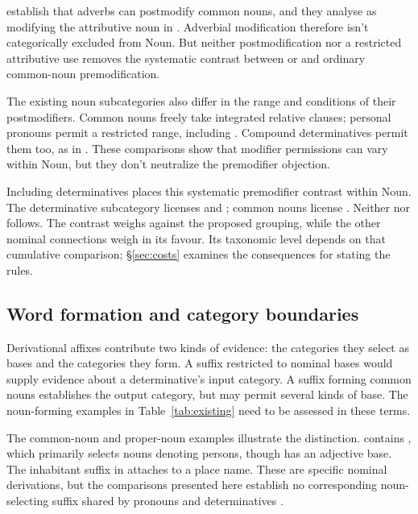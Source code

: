 \documentclass[12pt]{article}
\begin{document}
\textcite[42--47]{payne2010} establish that adverbs can postmodify common nouns, and they analyse  as modifying the attributive noun  in  \citep[p.~75, n.~3]{payne2010}. Adverbial modification therefore isn't categorically excluded from Noun. But neither postmodification nor a restricted attributive use removes the systematic contrast between  or  and ordinary common-noun premodification.

The existing noun subcategories also differ in the range and conditions of their postmodifiers. Common nouns freely take integrated relative clauses; personal pronouns permit a restricted range, including  \citep[430]{huddleston2002}. Compound determinatives permit them too, as in  \citep[423--424]{huddleston2002}. These comparisons show that modifier permissions can vary within Noun, but they don't neutralize the premodifier objection.

Including determinatives places this systematic premodifier contrast within Noun. The determinative subcategory licenses  and ; common nouns license . Neither  nor  follows. The contrast weighs against the proposed grouping, while the other nominal connections weigh in its favour. Its taxonomic level depends on that cumulative comparison; §\ref{sec:costs} examines the consequences for stating the rules.

\subsection{Word formation and category boundaries}\label{sec:word-formation}

Derivational affixes contribute two kinds of evidence: the categories they select as bases and the categories they form. A suffix restricted to nominal bases would supply evidence about a determinative's input category. A suffix forming common nouns establishes the output category, but may permit several kinds of base. The noun-forming examples in Table~\ref{tab:existing} need to be assessed in these terms.

The common-noun and proper-noun examples illustrate the distinction.  contains , which primarily selects nouns denoting persons, though  has an adjective base. The inhabitant suffix  in  attaches to a place name. These are specific nominal derivations, but the comparisons presented here establish no corresponding noun-selecting suffix shared by pronouns and determinatives \citep[Ch.~19, §§5.6.2(b), 5.7.2(k)]{huddleston2002}.
\end{document}
